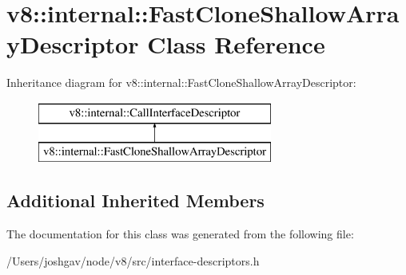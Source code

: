 \hypertarget{classv8_1_1internal_1_1_fast_clone_shallow_array_descriptor}{}\section{v8\+:\+:internal\+:\+:Fast\+Clone\+Shallow\+Array\+Descriptor Class Reference}
\label{classv8_1_1internal_1_1_fast_clone_shallow_array_descriptor}
Inheritance diagram for v8\+:\+:internal\+:\+:Fast\+Clone\+Shallow\+Array\+Descriptor\+:\begin{figure}[H]
\begin{center}
\leavevmode
\includegraphics[height=2.000000cm]{classv8_1_1internal_1_1_fast_clone_shallow_array_descriptor}
\end{center}
\end{figure}
\subsection*{Additional Inherited Members}


The documentation for this class was generated from the following file\+:\begin{DoxyCompactItemize}
\item 
/\+Users/joshgav/node/v8/src/interface-\/descriptors.\+h\end{DoxyCompactItemize}
